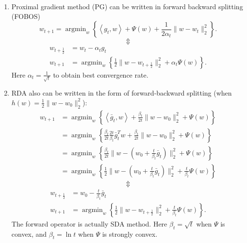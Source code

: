 \begin{enumerate}
	\item Proximal gradient method (PG) can be written in forward backward splitting (FOBOS)
	\begin{equation}
		w_{t+1}=\mathop{\arg \min}_w \left\{ \left<g_t, w \right> + \Psi(w)+\frac{1}{2\alpha_t}\|w-w_t\|_2^2  \right\}.
	\end{equation}
	\begin{equation*}
		\Updownarrow
	\end{equation*}
	\begin{equation}
		\begin{split}
			w_{t+\frac{1}{2}} &=w_t - \alpha_t g_t \\
			w_{t+1} &=\mathop{\arg \min}_w \left\{ \frac{1}{2}\|w-w_{t+\frac{1}{2}}\|^2_2 +\alpha_t \Psi(w) \right\}.
		\end{split}
	\end{equation}
	Here $\alpha_t=\frac{1}{\sqrt{t}}$ to obtain best convergence rate.
	
	\item RDA also can be written in the form of forward-backward splitting (when $h(w)=\frac{1}{2}\|w-w_0\|^2_2$):
	\begin{align}
		w_{t+1}&=\mathop{\arg\min}_w \left\{ \left<\bar g_t,w\right>+\frac{\beta_t}{2t}\|w-w_0\|^2_2+\Psi(w)\right\}\\
		& =\mathop{\arg\min}_w \left\{ \frac{\beta_t}{2t} \frac{2t}{\beta_t}\bar g_t^T w +\frac{\beta_t}{2t}\|w-w_0\|^2_2+\Psi(w)\right\}\\
		& =\mathop{\arg\min}_w \left\{ \frac{\beta_t}{2t}\|w-(w_0+\frac{t}{\beta_t} \bar g_t)\|^2_2+\Psi(w)\right\}\\
		&=\mathop{\arg\min}_w \left\{ \frac{1}{2}\|w-(w_0+\frac{t}{\beta_t} \bar g_t)\|^2_2+\frac{t}{\beta_t}\Psi(w)\right\}
	\end{align}
	\begin{equation*}
		\Updownarrow
	\end{equation*}
	\begin{align}
		w_{t+\frac{1}{2}} &=w_0-\frac{t}{\beta_t} \bar g_t \\
		w_{t+1} &= \mathop{\arg \min}_w \left\{ \frac{1}{2}\|w-w_{t+\frac{1}{2}}\|^2_2 + \frac{t}{\beta_t}\Psi(w) \right\}.
	\end{align}
	The forward operator is actually SDA method.
	Here $\beta_t = \sqrt{t}$ when $\Psi$ is convex, and $\beta_t=\ln t$ when $\Psi$ is strongly convex.
\end{enumerate}

